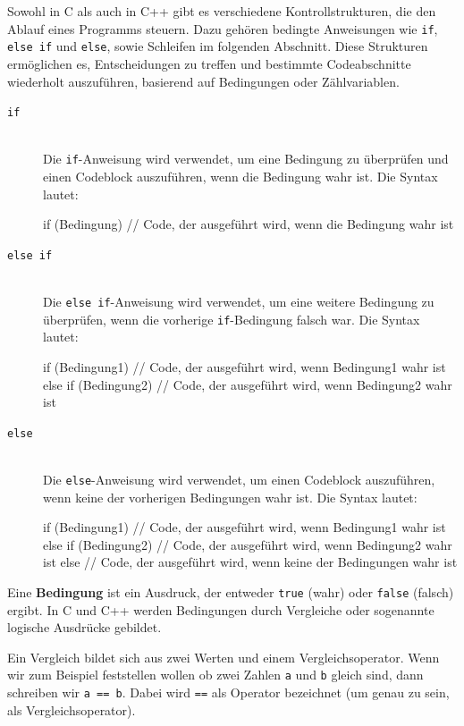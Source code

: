Sowohl in C als auch in C++ gibt es verschiedene Kontrollstrukturen, die den Ablauf eines Programms steuern. Dazu gehören bedingte Anweisungen wie \texttt{if}, \texttt{else if} und \texttt{else}, sowie Schleifen im folgenden Abschnitt. Diese Strukturen ermöglichen es, Entscheidungen zu treffen und bestimmte Codeabschnitte wiederholt auszuführen, basierend auf Bedingungen oder Zählvariablen.

\begin{description}
    \item[\texttt{if}]\hfill\\
        Die \texttt{if}-Anweisung wird verwendet, um eine Bedingung zu überprüfen und einen Codeblock auszuführen, wenn die Bedingung wahr ist. Die Syntax lautet:
\begin{code}
if (Bedingung) {
    // Code, der ausgeführt wird, wenn die Bedingung wahr ist
}
\end{code}

    \item[\texttt{else if}]\hfill\\
        Die \texttt{else if}-Anweisung wird verwendet, um eine weitere Bedingung zu überprüfen, wenn die vorherige \texttt{if}-Bedingung falsch war. Die Syntax lautet:
\begin{code}
if (Bedingung1) {
    // Code, der ausgeführt wird, wenn Bedingung1 wahr ist
} else if (Bedingung2) {
    // Code, der ausgeführt wird, wenn Bedingung2 wahr ist
}
\end{code}
    \item[\texttt{else}]\hfill\\
        Die \texttt{else}-Anweisung wird verwendet, um einen Codeblock auszuführen, wenn keine der vorherigen Bedingungen wahr ist. Die Syntax lautet:
\begin{code}
if (Bedingung1) {
    // Code, der ausgeführt wird, wenn Bedingung1 wahr ist
} else if (Bedingung2) {
    // Code, der ausgeführt wird, wenn Bedingung2 wahr ist
} else {
    // Code, der ausgeführt wird, wenn keine der Bedingungen wahr ist
}
\end{code}
\end{description}
Eine \textbf{Bedingung} ist ein Ausdruck, der entweder \texttt{true} (wahr) oder \texttt{false} (falsch) ergibt. In C und C++ werden Bedingungen durch Vergleiche oder sogenannte logische Ausdrücke gebildet. 

Ein Vergleich bildet sich aus zwei Werten und einem Vergleichsoperator. Wenn wir zum Beispiel feststellen wollen ob zwei Zahlen \texttt{a} und \texttt{b} gleich sind, dann schreiben wir \texttt{a == b}. Dabei wird \texttt{==} als Operator bezeichnet (um genau zu sein, als Vergleichsoperator). 

